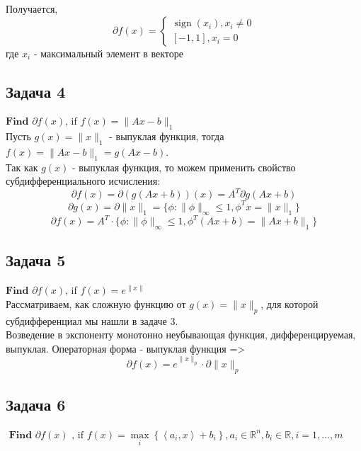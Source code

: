 \documentclass[12pt,letterpaper]{article}
\begin{document}
\begin{itemize}
Получается, 
$$
\partial f(x) = \left\{\begin{array}{l}
\operatorname{sign}\left(x_{i}\right), x_i \neq 0 \\
{[-1,1], x_i=0}
\end{array}\right.
$$
где $ x_i $ - максимальный элемент в векторе
\end{itemize}
 

\subsection*{Задача 4}
$\textbf{Find}$ $\partial f(x)$, if $f(x) = \|Ax - b\|_1$\\

Пусть $ g(x) = \|x\|_1 $ - выпуклая функция, тогда $ f(x) = \|Ax - b\|_1 = g(Ax-b) $.\\
Так как $ g(x) $ - выпуклая функция, то можем применить свойство субдифференциального исчисления: 
$$ \partial f(x) = \partial(g(A x+b))(x)=A^{T} \partial g(A x+b) $$ 
$$ \partial g(x) = \partial \|x\|_1 = \{ \phi : \|\phi\|_{\infty} \leq 1, \phi^T x = \|x\|_1 \} $$
$$ \partial f(x) = A^{T} \cdot \{ \phi : \|\phi\|_{\infty} \leq 1, \phi^T (Ax + b) = \|Ax + b\|_1 \} $$

\subsection*{Задача 5}
$\textbf{Find}$ $\partial f(x)$, if $f(x) = e^{\|x\|}$\\

Рассматриваем, как сложную функцию от $ g(x) = \|x\|_p $, для которой субдифференциал мы нашли в задаче 3.\\
Возведение в экспоненту монотонно неубывающая функция, дифференцируемая, выпуклая. Операторная форма - выпуклая функция =>
$$\partial f(x) = e^{\|x\|_p} \cdot \partial \|x\|_p$$

\subsection*{Задача 6}
$
\textbf { Find } \partial f(x) \text { , if } f(x)=\max\limits _{i}\left\{\left\langle a_{i}, x\right\rangle+b_{i}\right\}, a_{i} \in \mathbb{R}^{n}, b_{i} \in \mathbb{R}, i=1, \ldots, m
$\\
\end{document}
